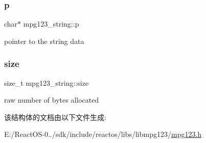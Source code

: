 \subsubsection{\texorpdfstring{p}{p}}
{\footnotesize\ttfamily char$\ast$ mpg123\+\_\+string\+::p}

pointer to the string data \mbox{\label{structmpg123__string_afa783be283e7e2f287f0b8a129701eba}} 
\subsubsection{\texorpdfstring{size}{size}}
{\footnotesize\ttfamily size\+\_\+t mpg123\+\_\+string\+::size}

raw number of bytes allocated 

该结构体的文档由以下文件生成\+:\begin{DoxyCompactItemize}
\item 
E\+:/\+React\+O\+S-\/0../sdk/include/reactos/libs/libmpg123/\hyperlink{mpg123_8h}{mpg123.\+h}\end{DoxyCompactItemize}
